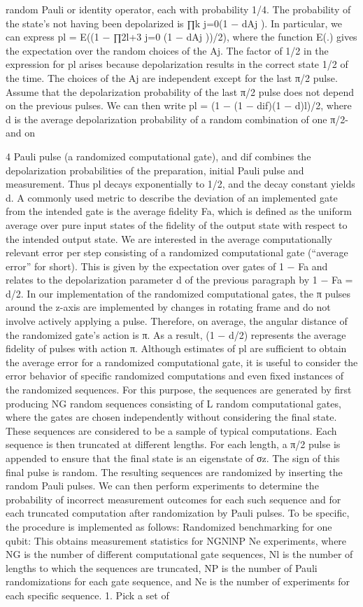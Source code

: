 random Pauli or identity operator, each with probability 1/4. The probability of the state’s not having been depolarized is ∏k j=0(1 − dAj ). In particular, we can express pl = E((1 − ∏2l+3 j=0 (1 − dAj ))/2), where the function E(.) gives the expectation over the random choices of the Aj. The factor of 1/2 in the expression for pl arises because depolarization results in the correct state 1/2 of the time. The choices of the Aj are independent except for the last π/2 pulse. Assume that the depolarization probability of the last π/2 pulse does not depend on the previous pulses. We can then write pl = (1 − (1 − dif)(1 − d)l)/2, where d is the average depolarization probability of a random combination of one π/2- and on

4 Pauli pulse (a randomized computational gate), and dif combines the depolarization probabilities of the preparation, initial Pauli pulse and measurement. Thus pl decays exponentially to 1/2, and the decay constant yields d. A commonly used metric to describe the deviation of an implemented gate from the intended gate is the average fidelity Fa, which is defined as the uniform average over pure input states of the fidelity of the output state with respect to the intended output state. We are interested in the average computationally relevant error per step consisting of a randomized computational gate (“average error” for short). This is given by the expectation over gates of 1 − Fa and relates to the depolarization parameter d of the previous paragraph by 1 − Fa = d/2. In our implementation of the randomized computational gates, the π pulses around the z-axis are implemented by changes in rotating frame and do not involve actively applying a pulse. Therefore, on average, the angular distance of the randomized gate’s action is π. As a result, (1 − d/2) represents the average fidelity of pulses with action π. Although estimates of pl are sufficient to obtain the average error for a randomized computational gate, it is useful to consider the error behavior of specific randomized computations and even fixed instances of the randomized sequences. For this purpose, the sequences are generated by first producing NG random sequences consisting of L random computational gates, where the gates are chosen independently without considering the final state. These sequences are considered to be a sample of typical computations. Each sequence is then truncated at different lengths. For each length, a π/2 pulse is appended to ensure that the final state is an eigenstate of σz. The sign of this final pulse is random. The resulting sequences are randomized by inserting the random Pauli pulses. We can then perform experiments to determine the probability of incorrect measurement outcomes for each such sequence and for each truncated computation after randomization by Pauli pulses. To be specific, the procedure is implemented as follows: Randomized benchmarking for one qubit: This obtains measurement statistics for NGNlNP Ne experiments, where NG is the number of different computational gate sequences, Nl is the number of lengths to which the sequences are truncated, NP is the number of Pauli randomizations for each gate sequence, and Ne is the number of experiments for each specific sequence. 1. Pick a set of 